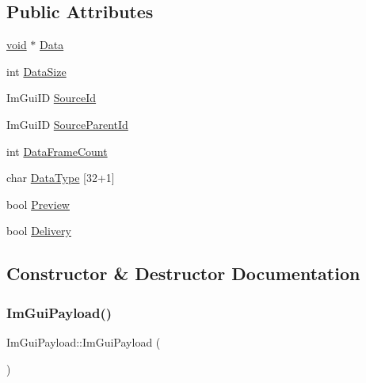 \subsection*{Public Attributes}
\begin{DoxyCompactItemize}
\item 
\hyperlink{imgui__impl__opengl3__loader_8h_ac668e7cffd9e2e9cfee428b9b2f34fa7}{void} $\ast$ \hyperlink{structImGuiPayload_af9f974dfb815e21a1ab925cab3769ab9}{Data}
\item 
int \hyperlink{structImGuiPayload_a6730d3ace5353afe204273995994cd92}{Data\+Size}
\item 
Im\+Gui\+ID \hyperlink{structImGuiPayload_aa574f7e237c6d2172977d142b25c0111}{Source\+Id}
\item 
Im\+Gui\+ID \hyperlink{structImGuiPayload_a1757c714dd47f09b645a8eba2912849d}{Source\+Parent\+Id}
\item 
int \hyperlink{structImGuiPayload_ab9f21d2454197d14896d5812ba70fa33}{Data\+Frame\+Count}
\item 
char \hyperlink{structImGuiPayload_a72ecfe510eb35932e54f11ee56fe7140}{Data\+Type} \mbox{[}32+1\mbox{]}
\item 
bool \hyperlink{structImGuiPayload_a1a5b6456247ef3c213f0706cc9da16e6}{Preview}
\item 
bool \hyperlink{structImGuiPayload_a4c0900e12c8d0bf6869c0ac6f8a66e31}{Delivery}
\end{DoxyCompactItemize}


\subsection{Constructor \& Destructor Documentation}
\mbox{\label{structImGuiPayload_a341c0039af838af0308a7449f8c1308b}} 
\subsubsection{\texorpdfstring{Im\+Gui\+Payload()}{ImGuiPayload()}}
{\footnotesize\ttfamily Im\+Gui\+Payload\+::\+Im\+Gui\+Payload (\begin{DoxyParamCaption}{ }\end{DoxyParamCaption})\hspace{0.3cm}{\ttfamily [inline]}}



